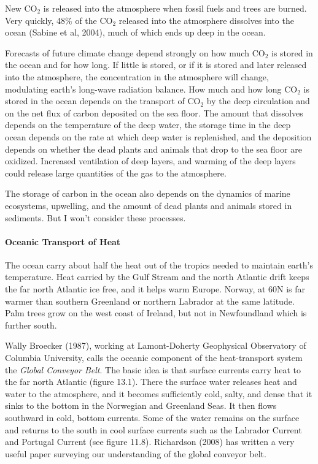 New CO$_ 2$ is released into the atmosphere when fossil fuels and
trees are burned. Very quickly, 48\% of the CO$_2$ released into the
atmosphere dissolves into the ocean (Sabine et al, 2004), much of
which ends up deep in the ocean.

Forecasts of future climate change depend strongly on how much CO$_2$
is stored in the ocean and for how long. If little is stored, or if it
is stored and later released into the atmosphere, the concentration in
the atmosphere will change, modulating earth's long-wave radiation
balance. How much and how long CO$_2$ is stored in the ocean depends
on the transport of CO$_2$ by the deep
circulation and on the net flux of carbon deposited on the sea
floor. The amount that dissolves depends on the temperature of the
deep water, the storage time in the deep ocean depends on the rate at
which deep water is replenished, and the deposition depends on whether
the dead plants and animals that drop to the sea floor are oxidized.
Increased ventilation of deep layers, and warming of the deep layers
could release large quantities of the gas to the atmosphere.

The storage of carbon in the ocean also depends on the dynamics of
marine ecosystems, upwelling, and
the amount of dead plants and animals stored in sediments. But I won't
consider these processes.

\paragraph{Oceanic Transport of Heat}
The ocean carry
about half the heat out of the tropics needed to maintain earth's
temperature. Heat carried by the Gulf Stream and the north Atlantic drift keeps the
far north Atlantic ice free, and it helps warm Europe. Norway, at
60\degrees N is far warmer than southern Greenland or northern
Labrador at the same latitude. Palm trees grow on the west coast of
Ireland, but not in Newfoundland which is further south.

Wally Broecker (1987), working at Lamont-Doherty Geophysical
Observatory of Columbia University, calls the oceanic component of the
heat-transport system the \textit{Global
  Conveyor Belt}. The basic idea is that surface
currents carry heat to the far north Atlantic (figure 13.1). There the
surface water releases heat and water to the atmosphere, and it
becomes sufficiently cold, salty, and dense that it sinks to the
bottom in the Norwegian and
Greenland Seas. It then flows southward in cold, bottom currents. Some
of the water remains on the surface and returns to the south in cool
surface currents such as the Labrador Current and Portugal Current
(see figure 11.8). Richardson (2008) has written a very useful paper
surveying our understanding of the global conveyor belt.

